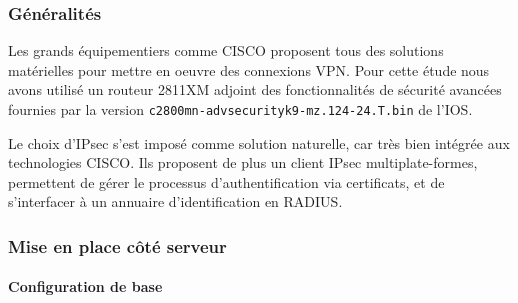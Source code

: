 \subsubsection{Généralités}

Les grands équipementiers comme CISCO proposent tous des solutions matérielles pour mettre en oeuvre des connexions VPN. Pour cette étude nous avons utilisé un routeur 2811XM adjoint des fonctionnalités de sécurité avancées fournies par la version \verb|c2800mn-advsecurityk9-mz.124-24.T.bin| de l'IOS.

Le choix d'IPsec s'est imposé comme solution naturelle, car très bien intégrée aux technologies CISCO. Ils proposent de plus un client IPsec multiplate-formes, permettent de gérer le processus d'authentification via certificats, et de s'interfacer à un annuaire d'identification en RADIUS.

\subsubsection{Mise en place côté serveur}

\paragraph{Configuration de base}
~

